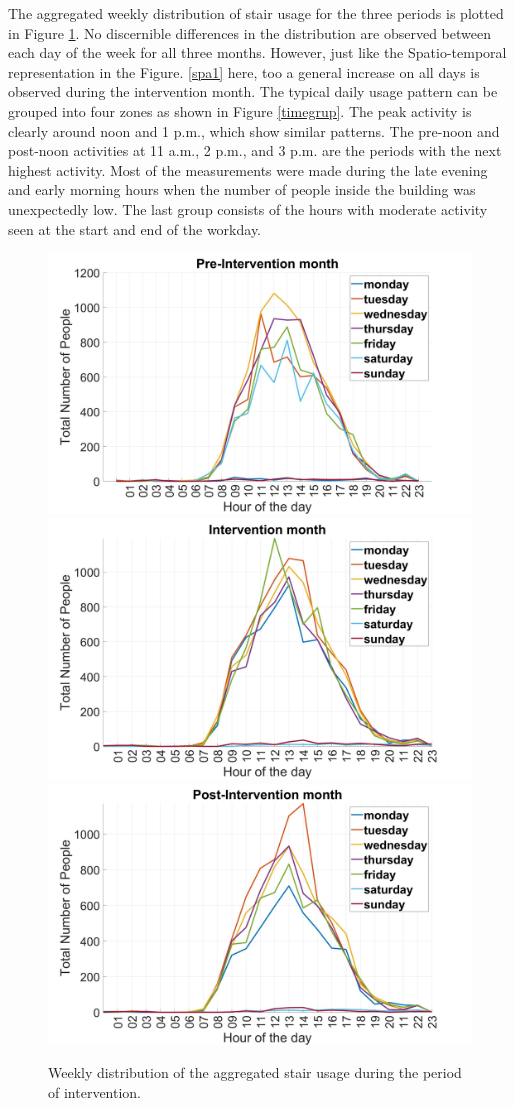 The aggregated weekly distribution of stair usage for the three periods is plotted in Figure \ref{spa2}. No discernible differences in the distribution are observed between each day of the week for all three months. However, just like the Spatio-temporal representation in the Figure. \ref{spa1} here, too a general increase on all days is observed during the intervention month. The typical daily usage pattern can be grouped into four zones as shown in Figure \ref{timegrup}. The peak activity is clearly around noon and 1 p.m., which show similar patterns. The pre-noon and post-noon activities at 11 a.m., 2 p.m., and 3 p.m. are the periods with the next highest activity. Most of the measurements were made during the late evening and early morning hours when the number of people inside the building was unexpectedly low. The last group consists of the hours with moderate activity seen at the start and end of the workday. 



\begin{figure}[htbp]
    \includegraphics[width=.5\textwidth]{image/aggWeekPre.jpg}\hfill
    \includegraphics[width=.5\textwidth]{image/aggWeekInt.jpg}\hfill\centering
    \includegraphics[width=.5\textwidth]{image/aggWeekPost.jpg}
    \\[\smallskipamount]
    \caption{Weekly distribution of the aggregated stair usage during the period of intervention.}
    \label{spa2}
\end{figure}




